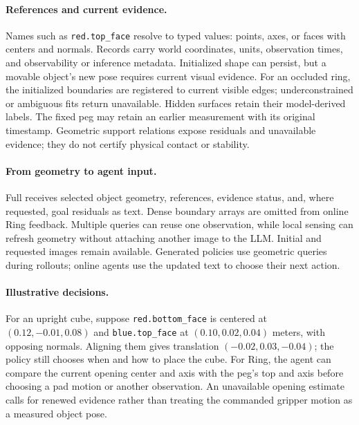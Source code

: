 \paragraph{References and current evidence.}
Names such as \texttt{red.top\_face} resolve to typed values: points, axes, or
faces with centers and normals. Records carry world coordinates, units,
observation times, and observability or inference metadata. Initialized shape
can persist, but a movable object's new pose requires current visual evidence.
For an occluded ring, the initialized boundaries are registered to current
visible edges; underconstrained or ambiguous fits return unavailable. Hidden
surfaces retain their model-derived labels. The fixed peg may retain an earlier
measurement with its original timestamp. Geometric support relations expose
residuals and unavailable evidence; they do not certify physical contact or
stability.

\paragraph{From geometry to agent input.}
Full receives selected object geometry, references, evidence status, and, where
requested, goal residuals as text. Dense boundary arrays are omitted from online
Ring feedback. Multiple queries can reuse one observation, while local sensing
can refresh geometry without attaching another image to the LLM. Initial and
requested images remain available. Generated policies use geometric queries
during rollouts; online agents use the updated text to choose their next action.

\paragraph{Illustrative decisions.}
For an upright cube, suppose \texttt{red.bottom\_face} is centered at
$(0.12,-0.01,0.08)$ and \texttt{blue.top\_face} at $(0.10,0.02,0.04)$ meters,
with opposing normals. Aligning them gives translation
$(-0.02,0.03,-0.04)$; the policy still chooses when and how to place the cube.
For Ring, the agent can compare the current opening center and axis with the
peg's top and axis before choosing a pad motion or another observation. An
unavailable opening estimate calls for renewed evidence rather than treating
the commanded gripper motion as a measured object pose.
